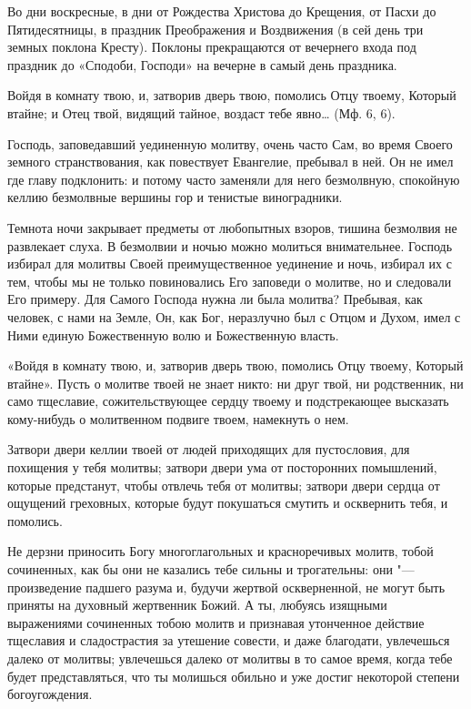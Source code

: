 {{{{Во дни воскресные, в дни от Рождества Христова до Крещения, от Пасхи до Пятидесятницы, в праздник Преображения и Воздвижения (в сей день три земных поклона Кресту). Поклоны прекращаются от вечернего входа под праздник до «Сподоби, Господи» на вечерне в самый день праздника.
\mychapterending

 


Войдя в комнату твою, и, затворив дверь твою, помолись Отцу твоему, Который втайне; и Отец твой, видящий тайное, воздаст тебе явно… (Мф. 6, 6).

Господь, заповедавший уединенную молитву, очень часто Сам, во время Своего земного странствования, как повествует Евангелие, пребывал в ней. Он не имел где главу подклонить: и потому часто заменяли для него безмолвную, спокойную келлию безмолвные вершины гор и тенистые виноградники.

Темнота ночи закрывает предметы от любопытных взоров, тишина безмолвия не развлекает слуха. В безмолвии и ночью можно молиться внимательнее. Господь избирал для молитвы Своей преимущественное уединение и ночь, избирал их с тем, чтобы мы не только повиновались Его заповеди о молитве, но и следовали Его примеру. Для Самого Господа нужна ли была молитва? Пребывая, как человек, с нами на Земле, Он, как Бог, неразлучно был с Отцом и Духом, имел с Ними единую Божественную волю и Божественную власть.

«Войдя в комнату твою, и, затворив дверь твою, помолись Отцу твоему, Который втайне». Пусть о молитве твоей не знает никто: ни друг твой, ни родственник, ни само тщеславие, сожительствующее сердцу твоему и подстрекающее высказать кому-нибудь о молитвенном подвиге твоем, намекнуть о нем.

Затвори двери келлии твоей от людей приходящих для пустословия, для похищения у тебя молитвы; затвори двери ума от посторонних помышлений, которые предстанут, чтобы отвлечь тебя от молитвы; затвори двери сердца от ощущений греховных, которые будут покушаться смутить и осквернить тебя, и помолись.

Не дерзни приносить Богу многоглагольных и красноречивых молитв, тобой сочиненных, как бы они не казались тебе сильны и трогательны: они "--- произведение падшего разума и, будучи жертвой оскверненной, не могут быть приняты на духовный жертвенник Божий. А ты, любуясь изящными выражениями сочиненных тобою молитв и признавая утонченное действие тщеславия и сладострастия за утешение совести, и даже благодати, увлечешься далеко от молитвы; увлечешься далеко от молитвы в то самое время, когда тебе будет представляться, что ты молишься обильно и уже достиг некоторой степени богоугождения.

}}}}
